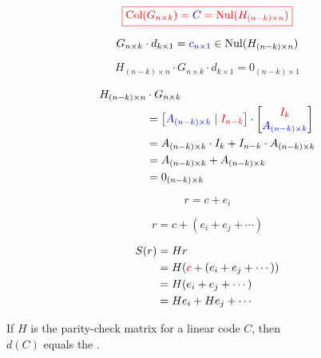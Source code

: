 \begin{frame}
  \[
	\textcolor{red}{\boxed{\text{Col}(G_{n \times k}) = \textcolor{blue}{C} = \text{Nul}(H_{(n-k) \times n})}}
  \]

  \pause
  \[
	G_{n \times k} \cdot d_{k \times 1} = \textcolor{blue}{c_{n \times 1}} \in \text{Nul}(H_{(n-k) \times n})
  \]

  \pause
  \[
	H_{(n-k) \times n} \cdot G_{n \times k} \cdot d_{k \times 1} = 0_{(n-k) \times 1}
  \]

  \pause
  \begin{align*}
	H_{(n-k) \times n} &\cdot G_{n \times k} \\
	&= \begin{bmatrix}
	  \textcolor{blue}{A_{(n-k) \times k}} \mid \textcolor{red}{I_{n-k}}
	\end{bmatrix}
	\cdot
	\begin{bmatrix}
	  \textcolor{red}{I_k} \\ \textcolor{blue}{A_{(n-k) \times k}}
	\end{bmatrix} \\
	&= A_{(n-k) \times k} \cdot I_k + I_{n-k} \cdot A_{(n-k) \times k} \\
	&= A_{(n-k) \times k} + A_{(n-k) \times k} \\
	&= 0_{(n-k) \times k}
  \end{align*}
\end{frame}

\begin{frame}
  \[
	r = c + e_i
  \]

  \[
	r = c + (e_{i} + e_{j} + \cdots)
  \]

  \pause
  \begin{definition}[Syndrome]
	\begin{align*}
	  S(r) &= H r \\
		&= H(\textcolor{red}{c} + (e_{i} + e_{j} + \cdots)) \\
		&= H (e_{i} + e_{j} + \cdots) \\
		&= H e_{i} + H e_{j} + \cdots \\
	\end{align*}
  \end{definition}
\end{frame}

\begin{frame}{}
  \begin{theorem}
	\begin{center}
	  If $H$ is the parity-check matrix for a linear code $C$, then \\
	  $d(C)$ equals the .
	\end{center}
  \end{theorem}

  \pause
\end{frame}

